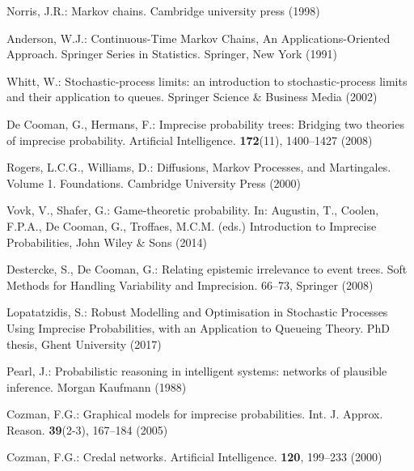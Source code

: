 \begin{thebibliography}{99.}

Norris, J.R.: {Markov chains}. Cambridge university press (1998)

Anderson, W.J.: Continuous-Time Markov Chains, An Applications-Oriented Approach. Springer Series in Statistics. Springer, New York (1991)

Whitt, W.: Stochastic-process limits: an introduction to stochastic-process
  limits and their application to queues. Springer Science \& Business Media
  (2002)


De Cooman, G., Hermans, F.: {Imprecise probability trees: Bridging two
theories of imprecise probability}. Artificial Intelligence. \textbf{172}(11), 1400--1427 (2008)

Rogers, L.C.G., Williams, D.: {Diffusions, Markov Processes, and Martingales}. Volume 1. Foundations. Cambridge University Press (2000)


Vovk, V., Shafer, G.: {Game-theoretic probability}. 
In: Augustin, T., Coolen, F.P.A., De Cooman, G., Troffaes, M.C.M. (eds.) Introduction to Imprecise Probabilities, {John Wiley \& Sons} (2014) 

Destercke, S., De Cooman, G.: {Relating epistemic irrelevance to event trees}. 
Soft Methods for Handling Variability and Imprecision. 66--73, Springer (2008)

Lopatatzidis, S.: {Robust Modelling and Optimisation in Stochastic Processes Using Imprecise Probabilities, with an Application to Queueing Theory}.
 PhD thesis, Ghent University (2017)


Pearl, J.: {Probabilistic  reasoning  in  intelligent  systems: networks  of  plausible  inference}. Morgan  Kaufmann (1988)

Cozman, F.G.: {Graphical models for imprecise probabilities}.
Int. J. Approx. Reason. \textbf{39}(2-3), 167--184 (2005)

Cozman, F.G.: {Credal networks}. Artificial Intelligence. \textbf{120}, 199--233 (2000)


\end{thebibliography}
